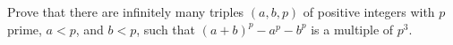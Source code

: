 Prove that there are infinitely many triples $\left(a,b,p\right)$ of positive integers with $p$ prime, $a<p$, and $b<p$, such that $\left(a+b\right)^p-a^p-b^p$ is a multiple of $p^3$.